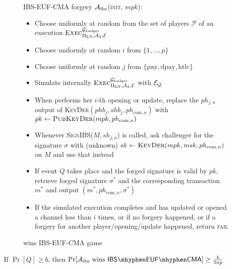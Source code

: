   \begin{figure}[H]
    \begin{algobox}{\textsf{IBS-EUF-CMA} forgery}
      $\mathcal{A}_{\mathrm{ibs}}$(\textsc{init}, $mpk$):
      \begin{itemize}
        \item Choose uniformly at random \alice{} from the set of players
        $\mathcal{P}$ of an execution
        $\textsc{Exec}^{\mathcal{G}_{\mathrm{Ledger}}}_{\Pi_{\mathrm{LN}}, \mathcal{A}_{\mathrm{d}},
        \mathcal{E}}$
        \item Choose uniformly at random $i$ from $\{1, \dots, p\}$
        \item Choose uniformly at random $j$ from $\{\mathrm{pay},
        \mathrm{dpay}, \mathrm{htlc}\}$
        \item Simulate internally
        $\textsc{Exec}^{\mathcal{G}_{\mathrm{Ledger}}}_{\Pi_{\mathrm{LN}}, \mathcal{A}_{\mathrm{d}},
        \mathcal{E}}$ with $\mathcal{E}_Q$
        \item When \alice{} performs her $i$-th opening or update, replace the
        $ph_{j, n}$ output of \textsc{KeyDer}$(phb_j, shb_j, ph_{\mathrm{com},
        n})$ with $pk \gets \textsc{PubKeyDer}(mpk, ph_{\mathrm{com}, n})$
        \item Whenever \textsc{SignIBS}($M, sh_{j, n}$) is called, ask
        challenger for the signature $\sigma$ with (unknown) $sk \gets
        \textsc{KeyDer}(mpk, msk, ph_{\mathrm{com}, n})$ on $M$ and use that
        instead
        \item If event $Q$ takes place and the forged signature is valid by
        $pk$, retrieve forged signature $\sigma^*$ and the corresponding
        transaction $m^*$ and output $(m^*, ph_{\mathrm{com}, n},\sigma^*)$
        \item If the simulated execution completes and \alice{} has updated or
        opened a channel less than $i$ times, or if no forgery happened, or if a
        forgery for another player/opening/update happened, return \textsc{fail}
      \end{itemize}
    \end{algobox}
    \caption{wins \textsf{IBS-EUF-CMA} game}
    \label{alg:forge:ibs}
  \end{figure}

  \begin{proposition}
  \label{prop:forgery:ibs}
    If $\Pr[Q] \geq b$, then $\Pr[\adversary_{\mathrm{ibs}} \text{ wins }
    \mathsf{IBS \mhyphen EUF \mhyphen CMA}] \geq \frac{b}{3np}$
  \end{proposition}

